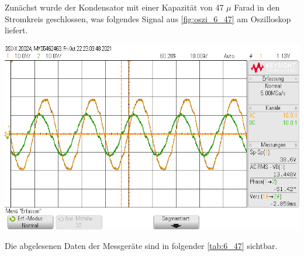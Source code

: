 \documentclass[11pt,ngerman]{scrartcl}
\begin{document}
Zunächst wurde der Kondensator mit einer Kapazität von 47 $\mu$ Farad in den Stromkreis geschlossen, was folgendes Signal aus \autoref{fig:oszi_6_47} am Oszilloskop liefert.

\begin{center}
	\begin{minipage}[t]{0.7\textwidth}
		\includegraphics[width=\textwidth]{Phasenzeug/scope_14}
		\label{fig:oszi_6_47}
	\end{minipage}
\end{center}

Die abgelesenen Daten der Messgeräte sind in folgender \autoref{tab:6_47} sichtbar.
\end{document}
